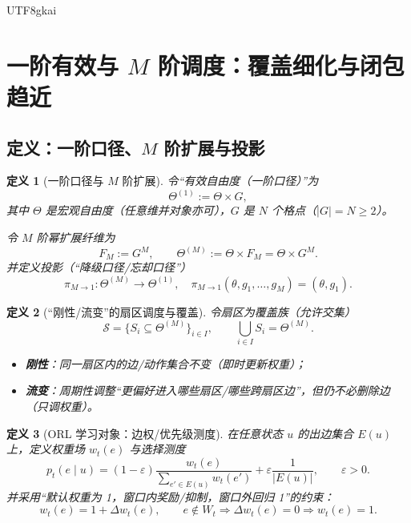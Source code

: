 \documentclass[12pt]{article}
\newtheorem{definition}{定义}[section]
\begin{document}
\begin{CJK*}{UTF8}{gkai}
\clearpage

\section{一阶有效与 \texorpdfstring{$M$}{M} 阶调度：覆盖细化与闭包趋近}
\label{sec:tex27-ch3-first-order-effective}

\subsection{定义：一阶口径、\texorpdfstring{$M$}{M} 阶扩展与投影}
\label{subsec:tex27-ch3-defs}

\begin{definition}[一阶口径与 $M$ 阶扩展]
\label{def:tex27-ch3-d1}
令“有效自由度（一阶口径）”为
\[
  \Theta^{(1)} := \Theta \times G,
\]
其中 $\Theta$ 是宏观自由度（任意维并对象亦可），$G$ 是 $N$ 个格点（$|G|=N\ge 2$）。

令 $M$ 阶幂扩展纤维为
\[
  F_M := G^M,\qquad \Theta^{(M)} := \Theta \times F_M=\Theta\times G^M.
\]
并定义投影（“降级口径/忘却口径”）
\[
  \pi_{M\to 1}:\Theta^{(M)}\to\Theta^{(1)},\quad
  \pi_{M\to 1}(\theta,g_1,\dots,g_M)=(\theta,g_1).
\]
\end{definition}

\begin{definition}[“刚性/流变”的扇区调度与覆盖]
\label{def:tex27-ch3-d2}
令扇区为覆盖族（允许交集）
\[
  \mathcal{S}=\{S_i\subseteq \Theta^{(M)}\}_{i\in I},
  \qquad
  \bigcup_{i\in I} S_i=\Theta^{(M)}.
\]
\begin{itemize}
  \item \textbf{刚性}：同一扇区内的边/动作集合不变（即时更新权重）；
  \item \textbf{流变}：周期性调整“更偏好进入哪些扇区/哪些跨扇区边”，但仍不必删除边（只调权重）。
\end{itemize}
\end{definition}

\begin{definition}[ORL 学习对象：边权/优先级测度]
\label{def:tex27-ch3-d3}
在任意状态 $u$ 的出边集合 $E(u)$ 上，定义权重场 $w_t(e)$ 与选择测度
\[
  p_t(e\mid u)
  =(1-\varepsilon)\frac{w_t(e)}{\sum_{e'\in E(u)}w_t(e')}
  +\varepsilon\frac{1}{|E(u)|},
  \qquad \varepsilon>0.
\]
并采用“默认权重为 1，窗口内奖励/抑制，窗口外回归 1”的约束：
\[
  w_t(e)=1+\Delta w_t(e),
  \qquad
  e\notin W_t\Rightarrow \Delta w_t(e)=0\Rightarrow w_t(e)=1.
\]
\end{definition}


\end{CJK*}
\end{document}
